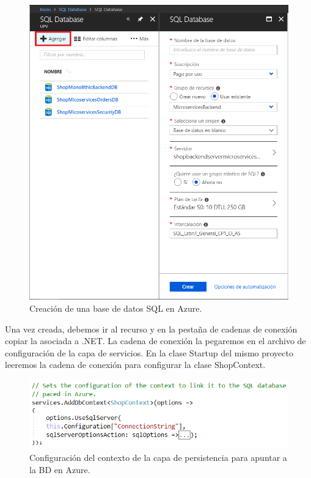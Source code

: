 \documentclass[11pt,spanish,listoffigures]{tfgetsinf}
\begin{document}
\begin{figure}[h]
\centering
\includegraphics[scale=0.4]{CreateDB}
\caption{Creación de una base de datos SQL en Azure.}
\end{figure}

Una vez creada, debemos ir al recurso y en la pestaña de cadenas de conexión copiar la asociada a .NET. La cadena de conexión la pegaremos en el archivo de configuración de la capa de servicios. En la clase Startup del mismo proyecto leeremos la cadena de conexión para configurar la clase ShopContext.

\begin{figure}[h]
\centering
\includegraphics[scale=0.7]{AddDbContext}
\caption{Configuración del contexto de la capa de persistencia para apuntar a la BD en Azure.}
\end{figure}
\end{document}
